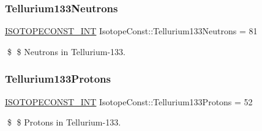 \subsubsection{\texorpdfstring{Tellurium133\+Neutrons}{Tellurium133Neutrons}}
{\footnotesize\ttfamily \mbox{\hyperlink{group___isotope_const-_macros_ga5f18360b3e99483a35c32d789e62621c}{I\+S\+O\+T\+O\+P\+E\+C\+O\+N\+S\+T\+\_\+\+I\+NT}} Isotope\+Const\+::\+Tellurium133\+Neutrons = 81}

\$ \$ Neutrons in Tellurium-\/133. \mbox{\label{group___isotope_const-_tellurium-_te133_ga7ceb1a3c4c9878574cc5ae51dcfdff99}} 
\subsubsection{\texorpdfstring{Tellurium133\+Protons}{Tellurium133Protons}}
{\footnotesize\ttfamily \mbox{\hyperlink{group___isotope_const-_macros_ga5f18360b3e99483a35c32d789e62621c}{I\+S\+O\+T\+O\+P\+E\+C\+O\+N\+S\+T\+\_\+\+I\+NT}} Isotope\+Const\+::\+Tellurium133\+Protons = 52}

\$ \$ Protons in Tellurium-\/133. 